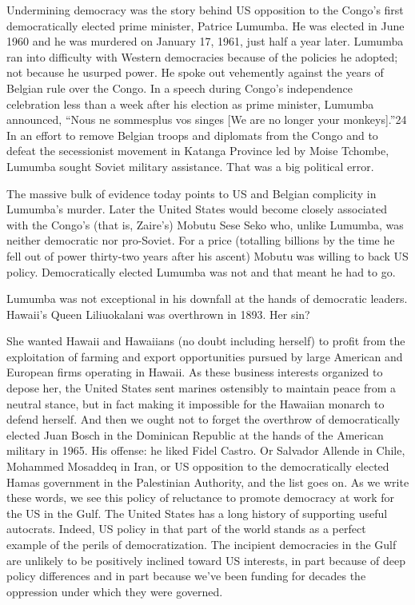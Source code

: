\documentclass[10pt]{article}
\begin{document}
{\large Undermining democracy was the story behind US opposition to the Congo's
first democratically elected prime minister, Patrice Lumumba. He was elected in
June 1960 and he was murdered on January 17, 1961, just half a year later.
Lumumba ran into difficulty with Western democracies because of the policies he
adopted; not because he usurped power. He spoke out vehemently against the years
of Belgian rule over the Congo. In a speech during Congo's independence
celebration less than a week after his election as prime minister, Lumumba
announced, ``Nous ne sommesplus vos singes [We are no longer your monkeys].''24
In an effort to remove Belgian troops and diplomats from the Congo and to defeat
the secessionist movement in Katanga Province led by Moise Tchombe, Lumumba
sought Soviet military assistance. That was a big political error.}

{\large The massive bulk of evidence today points to US and Belgian complicity
in Lumumba's murder. Later the United States would become closely associated with
the Congo's (that is, Zaire's) Mobutu Sese Seko who, unlike Lumumba, was neither
democratic nor pro-Soviet. For a price (totalling billions by the time he fell
out of power thirty-two years after his ascent) Mobutu was willing to back US
policy. Democratically elected Lumumba was not and that meant he had to go.}

{\large Lumumba was not exceptional in his downfall at the hands of democratic
leaders. Hawaii's Queen Liliuokalani was overthrown in 1893. Her sin?}

{\large She wanted Hawaii and Hawaiians (no doubt including herself) to profit
from the exploitation of farming and export opportunities pursued by large
American and European firms operating in Hawaii. As these business interests
organized to depose her, the United States sent marines ostensibly to maintain
peace from a neutral stance, but in fact making it impossible for the Hawaiian
monarch to defend herself. And then we ought not to forget the overthrow of
democratically elected Juan Bosch in the Dominican Republic at the hands of the
American military in 1965. His offense: he liked Fidel Castro. Or Salvador
Allende in Chile, Mohammed Mosaddeq in Iran, or US opposition to the
democratically elected Hamas government in the Palestinian Authority, and the
list goes on. As we write these words, we see this policy of reluctance to
promote democracy at work for the US in the Gulf. The United States has a long
history of supporting useful autocrats. Indeed, US policy in that part of the
world stands as a perfect example of the perils of democratization. The incipient
democracies in the Gulf are unlikely to be positively inclined toward US
interests, in part because of deep policy differences and in part because we've
been funding for decades the oppression under which they were governed.}
\end{document}
